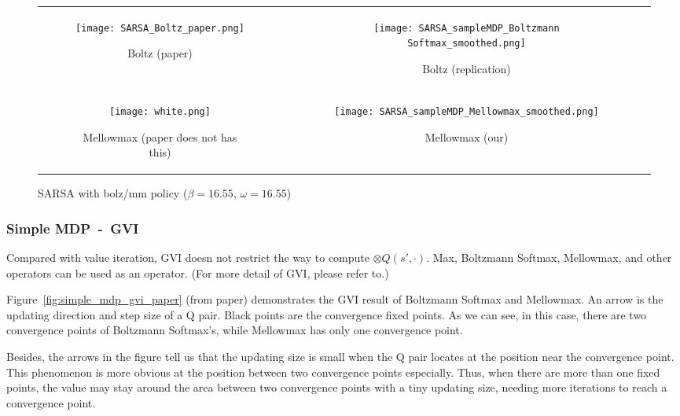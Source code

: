 {\centering
\begin{figure}[H]
\begin{tabular}{cc}
\begin{subfigure}{0.45\textwidth}\centering\texttt{[image: SARSA\_Boltz\_paper.png]}\caption{Boltz (paper)}\end{subfigure}&
\begin{subfigure}{0.45\textwidth}\centering\texttt{[image: SARSA\_sampleMDP\_Boltzmann Softmax\_smoothed.png]}\caption{Boltz (replication)}\end{subfigure}\\
\newline
\begin{subfigure}{0.45\textwidth}\centering\texttt{[image: white.png]}\caption{Mellowmax (paper does not has this)}\end{subfigure}&
\begin{subfigure}{0.45\textwidth}\centering\texttt{[image: SARSA\_sampleMDP\_Mellowmax\_smoothed.png]}\caption{Mellowmax (our)}\end{subfigure}\\
\end{tabular}
\caption{SARSA with bolz/mm policy ($\beta=16.55$, $\omega=16.55$)}\label{fig:simple_mdp_sarsa}
\end{figure}}

\subsubsection{Simple MDP\ -\ GVI}

Compared with value iteration, GVI doesn not restrict the way to compute 
$\otimes Q(s',\cdot)$. Max, Boltzmann Softmax, Mellowmax, and other operators can be used as an operator.
(For more detail of GVI, please refer to\cite{littman1996generalized}.)

Figure\ \ref{fig:simple_mdp_gvi_paper} (from paper) demonstrates the GVI result of
Boltzmann Softmax and Mellowmax. An arrow is the updating direction and step size of a Q pair.
Black points are the convergence fixed points. As we can see, in this case, there are two convergence points of Boltzmann Softmax's,
while Mellowmax has only one convergence point. 

Besides, the arrows in the figure tell us that the updating size is small 
when the Q pair locates at the position near the convergence point.
This phenomenon is more obvious at the position between two convergence points especially.
Thus, when there are more than one fixed points, 
the value may stay around the area between two convergence points with a tiny updating size, 
needing more iterations to reach a convergence point.


